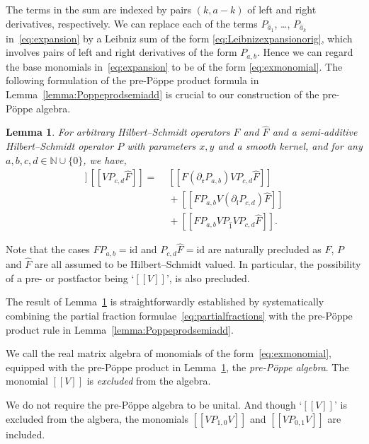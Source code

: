 \documentclass[5p,twocolumn]{elsarticle}
\newcommand*{\id}{{\mathrm{id}}}
\newcommand*{\pa}{{\partial}}
\newcommand*{\lb}{[\![}
\newcommand*{\rb}{]\!]}
\newcommand*{\el}{\mathfrak l}
\newcommand*{\rl}{\mathfrak r}
\newtheorem{lemma}[theorem]{Lemma}
\begin{document}
The terms in the sum are indexed by pairs $(k,a-k)$ of left and right derivatives, respectively.
We can replace each of the terms $P_{\hat{a}_1}$, \ldots, $P_{\hat{a}_k}$ in~\eqref{eq:expansion} by a Leibniz sum of the form \eqref{eq:Leibnizexpansionorig},
which involves pairs of left and right derivatives of the form $P_{a,b}$.
Hence we can regard the base monomials in~\eqref{eq:expansion} to be of the form \eqref{eq:exmonomial}.
The following formulation of the pre-P\"oppe product formula in Lemma~\ref{lemma:Poppeprodsemiadd} is crucial to our construction of the pre-P\"oppe algebra. 
%
\begin{lemma}\label{lemma:Poppeprodmonomials}
  For arbitrary Hilbert--Schmidt operators $F$ and $\hat{F}$ and a semi-additive Hilbert--Schmidt operator $P$
  with parameters $x,y$ and a smooth kernel, and for any $a,b,c,d\in\mathbb N\cup\{0\}$, we have,
  \begin{align*}
  \lb FP_{a,b} V\rb\,\lb VP_{c,d}\hat{F}\rb=&\;\lb F(\pa_{\rl}P_{a,b})VP_{c,d}\hat{F}\rb\\
                                              &\;+\lb FP_{a,b} V(\pa_{\el}P_{c,d})\hat{F}\rb\\
                                              &\;+\lb FP_{a,b} VP_{\hat{1}} VP_{c,d}\hat{F}\rb.
  \end{align*}
\end{lemma}
%
\begin{remark}
  Note that the cases $FP_{a,b}=\id$ and $P_{c,d}\hat F=\id$ are naturally precluded as $F$, $P$ and $\hat{F}$ are all assumed to be Hilbert--Schmidt valued.
  In particular, the possibility of a pre- or postfactor being `$\lb V\rb$', is also precluded.
\end{remark}
%
The result of Lemma~\ref{lemma:Poppeprodmonomials} is straightforwardly established by systematically combining the partial fraction formulae~\eqref{eq:partialfractions}
with the pre-P\"oppe product rule in Lemma~\ref{lemma:Poppeprodsemiadd}.
%
\begin{definition}\label{def:prePoppealg}
  We call the real matrix algebra of monomials of the form~\eqref{eq:exmonomial}, equipped with the pre-P\"oppe product in Lemma~\ref{lemma:Poppeprodmonomials}, the \emph{pre-P\"oppe algebra}.
  The monomial $\lb V\rb$ is \emph{excluded} from the algebra. 
\end{definition}
%
\begin{remark}
   We do not require the pre-P\"oppe algebra to be unital. And though `$\lb V\rb$' is excluded from the algbera, the monomials $\lb VP_{1,0}V\rb$ and $\lb VP_{0,1}V\rb$ are included.
\end{remark}
\end{document}
